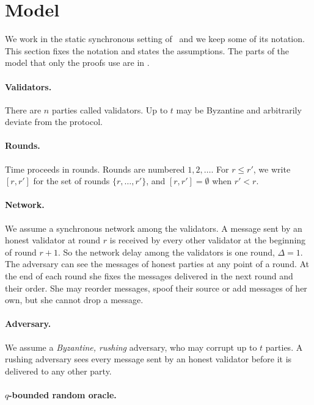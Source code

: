 \section{Model}
\label{sec.model}

We work in the static synchronous setting of~\cite{gkl24} and we keep some of
its notation. This section fixes the notation and states the assumptions. The
parts of the model that only the proofs use are in .

\paragraph{Validators.}

There are $n$ parties called validators. Up to $t$ may be Byzantine and
arbitrarily deviate from the protocol.

\paragraph{Rounds.}

Time proceeds in rounds. Rounds are numbered $1,2,\dots$. For $r\le r'$, we
write $[r,r']$ for the set of rounds $\{r,\dots,r'\}$, and $[r,r']=\emptyset$
when $r'<r$.

\paragraph{Network.}

We assume a synchronous network among the validators. A message sent by an
honest validator at round $r$ is received by every other validator at the
beginning of round $r+1$. So the network delay among the validators is one
round, $\Delta=1$. The adversary can see the messages of honest parties
at any point of a round. At the end of each round she fixes the messages
delivered in the next round and their order. She may reorder messages, spoof
their source or add messages of her own, but she cannot drop a message.

\paragraph{Adversary.}

We assume a \emph{Byzantine, rushing} adversary, who may corrupt up to $t$
parties. A rushing adversary sees every message sent by an honest validator
before it is delivered to any other party.

\paragraph{$q$-bounded random oracle.}

